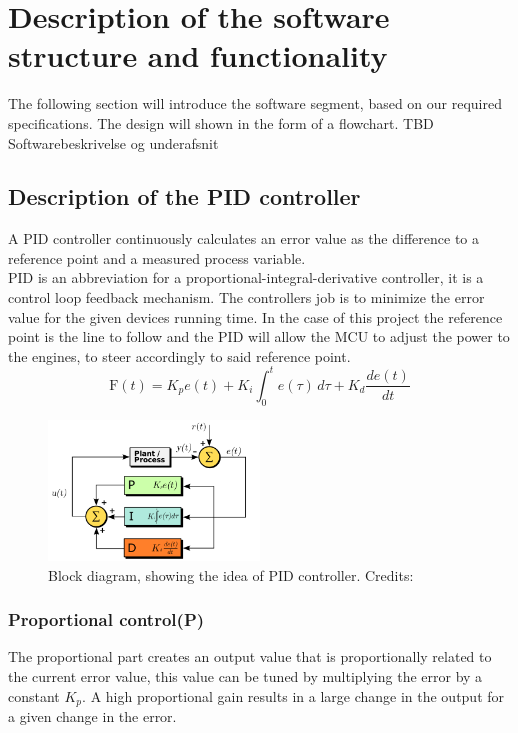 \section{Description of the software structure and functionality}

The following section will introduce the software segment, based on our required specifications. The design will shown in the form of a flowchart.
TBD Softwarebeskrivelse og underafsnit

\subsection {Description of the PID controller} 
 
A PID controller continuously calculates an error value as the difference to a reference point and a measured process variable.\\
PID is an abbreviation for a proportional-integral-derivative controller, it is a control loop feedback mechanism. The controllers job is to minimize the error value for the given devices running time. In the case of this project the reference point is the line to follow and the PID will allow the MCU to adjust the power to the engines, to steer accordingly to said reference point.
$$\mathrm{F}(t)=K_p{e(t)} + K_{i}\int_{0}^{t}{e(\tau)}\,{d\tau} + K_{d}\frac{de(t)}{dt}$$

\begin{figure}[h!]
  \centering
  \includegraphics[width=0.5\textwidth]{figures/PID_block.png}
  
  \caption{Block diagram, showing the idea of PID controller. Credits: %
  }
  \label{PID controller}
\end{figure}

\subsubsection {Proportional control(P)}

The proportional part creates an output value that is proportionally related to the current error value, this value can be tuned by multiplying the error by a constant $K_p$. A high proportional gain results in a large change in the output for a given change in the error. 


